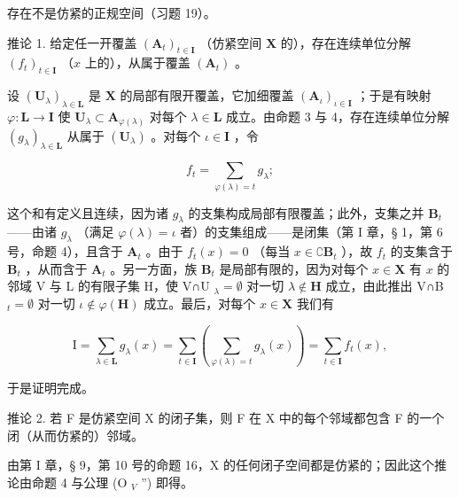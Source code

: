 存在不是仿紧的正规空间（习题 19）。

推论 1. 给定任一开覆盖 \((\mathbf{A}_t)_{t \in \mathbf{I}}\) （仿紧空间 \(\mathbf{X}\) 的），存在连续单位分解 \((f_t)_{t \in \mathbf{I}}\) （\(x\) 上的），从属于覆盖 \((\mathbf{A}_t)\) 。

设 \((\mathbf{U}_{\lambda})_{\lambda \in \mathbf{L}}\) 是 \(\mathbf{X}\) 的局部有限开覆盖，它加细覆盖 \((\mathbf{A}_{\iota})_{\iota \in \mathbf{I}}\) ；于是有映射 \(\varphi : \mathbf{L} \to \mathbf{I}\) 使 \(\mathbf{U}_{\lambda} \subset \mathbf{A}_{\varphi(\lambda)}\) 对每个 \(\lambda \in \mathbf{L}\) 成立。由命题 3 与 4，存在连续单位分解 \((g_{\lambda})_{\lambda \in \mathbf{L}}\) 从属于 \((\mathbf{U}_{\lambda})\) 。对每个 \(\iota \in \mathbf{I}\) ，令

\[
f _ {t} = \sum_ {\varphi (\lambda) = t} g _ {\lambda};
\]

这个和有定义且连续，因为诸 \(g_{\lambda}\) 的支集构成局部有限覆盖；此外，支集之并 \(\mathbf{B}_{t}\) ——由诸 \(g_{\lambda}\) （满足 \(\varphi(\lambda)=\iota\) 者）的支集组成——是闭集（第 I 章，§ 1，第 6 号，命题 4），且含于 \(\mathbf{A}_{t}\) 。由于 \(f_{t}(x)=0\) （每当 \(x\in\complement\mathbf{B}_{t}\) ），故 \(f_{t}\) 的支集含于 \(\mathbf{B}_{t}\) ，从而含于 \(\mathbf{A}_{t}\) 。另一方面，族 \(\mathbf{B}_{t}\) 是局部有限的，因为对每个 \(x\in\mathbf{X}\) 有 \(x\) 的邻域 V 与 L 的有限子集 H，使 V∩U \(_{\lambda}=\emptyset\) 对一切 \(\lambda\notin\mathbf{H}\) 成立，由此推出 V∩B \(_{t}=\emptyset\) 对一切 \(\iota\notin\varphi(\mathbf{H})\) 成立。最后，对每个 \(x\in\mathbf{X}\) 我们有

\[
\mathrm{I} = \sum_ {\lambda \in \mathbf {L}} g _ {\lambda} (x) = \sum_ {t \in \mathbf {I}} \left(\sum_ {\varphi (\lambda) = t} g _ {\lambda} (x)\right) = \sum_ {t \in \mathbf {I}} f _ {t} (x),
\]

于是证明完成。

推论 2. 若 F 是仿紧空间 X 的闭子集，则 F 在 X 中的每个邻域都包含 F 的一个闭（从而仿紧的）邻域。

由第 I 章，§ 9，第 10 号的命题 16，X 的任何闭子空间都是仿紧的；因此这个推论由命题 4 与公理 (O \(_{V}\) '') 即得。
